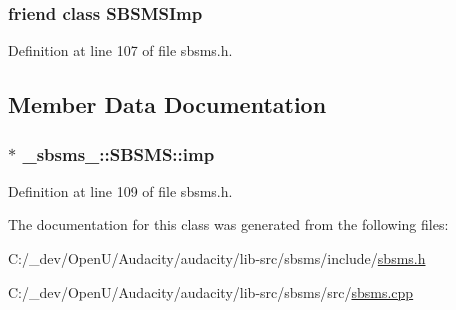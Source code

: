 \subsubsection[{\texorpdfstring{S\+B\+S\+M\+S\+Imp}{SBSMSImp}}]{\setlength{\rightskip}{0pt plus 5cm}friend class {\bf S\+B\+S\+M\+S\+Imp}\hspace{0.3cm}{\ttfamily [friend]}}\hypertarget{class__sbsms___1_1_s_b_s_m_s_ae4bb3357a0671b046cff2cadf6c5ab2b}{}\label{class__sbsms___1_1_s_b_s_m_s_ae4bb3357a0671b046cff2cadf6c5ab2b}


Definition at line 107 of file sbsms.\+h.



\subsection{Member Data Documentation}
\subsubsection[{\texorpdfstring{imp}{imp}}]{$\ast$ \+\_\+sbsms\+\_\+\+::\+S\+B\+S\+M\+S\+::imp\hspace{0.3cm}{\ttfamily [protected]}}\hypertarget{class__sbsms___1_1_s_b_s_m_s_aebf7e6188acf549e5d948b50958bbcbf}{}\label{class__sbsms___1_1_s_b_s_m_s_aebf7e6188acf549e5d948b50958bbcbf}


Definition at line 109 of file sbsms.\+h.



The documentation for this class was generated from the following files\+:\begin{DoxyCompactItemize}
\item 
C\+:/\+\_\+dev/\+Open\+U/\+Audacity/audacity/lib-\/src/sbsms/include/\hyperlink{sbsms_8h}{sbsms.\+h}\item 
C\+:/\+\_\+dev/\+Open\+U/\+Audacity/audacity/lib-\/src/sbsms/src/\hyperlink{sbsms_8cpp}{sbsms.\+cpp}\end{DoxyCompactItemize}
